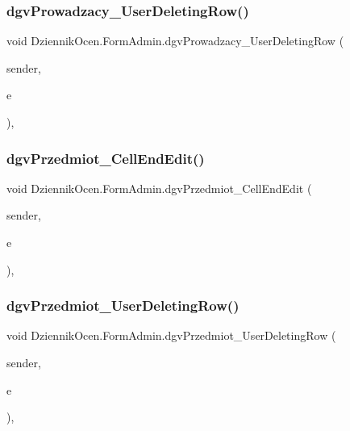 \subsubsection{\texorpdfstring{dgv\+Prowadzacy\+\_\+\+User\+Deleting\+Row()}{dgvProwadzacy\_UserDeletingRow()}}
{\footnotesize\ttfamily void Dziennik\+Ocen.\+Form\+Admin.\+dgv\+Prowadzacy\+\_\+\+User\+Deleting\+Row (\begin{DoxyParamCaption}\item[{object}]{sender,  }\item[{Data\+Grid\+View\+Row\+Cancel\+Event\+Args}]{e }\end{DoxyParamCaption})\hspace{0.3cm}{\ttfamily [inline]}, {\ttfamily [private]}}

\mbox{\label{class_dziennik_ocen_1_1_form_admin_adf080cf9bf6ce910be2b1b539c5c6bc2}} 
\subsubsection{\texorpdfstring{dgv\+Przedmiot\+\_\+\+Cell\+End\+Edit()}{dgvPrzedmiot\_CellEndEdit()}}
{\footnotesize\ttfamily void Dziennik\+Ocen.\+Form\+Admin.\+dgv\+Przedmiot\+\_\+\+Cell\+End\+Edit (\begin{DoxyParamCaption}\item[{object}]{sender,  }\item[{Data\+Grid\+View\+Cell\+Event\+Args}]{e }\end{DoxyParamCaption})\hspace{0.3cm}{\ttfamily [inline]}, {\ttfamily [private]}}

\mbox{\label{class_dziennik_ocen_1_1_form_admin_a5ff03e7113d930afdf9d0c651734fae0}} 
\subsubsection{\texorpdfstring{dgv\+Przedmiot\+\_\+\+User\+Deleting\+Row()}{dgvPrzedmiot\_UserDeletingRow()}}
{\footnotesize\ttfamily void Dziennik\+Ocen.\+Form\+Admin.\+dgv\+Przedmiot\+\_\+\+User\+Deleting\+Row (\begin{DoxyParamCaption}\item[{object}]{sender,  }\item[{Data\+Grid\+View\+Row\+Cancel\+Event\+Args}]{e }\end{DoxyParamCaption})\hspace{0.3cm}{\ttfamily [inline]}, {\ttfamily [private]}}

